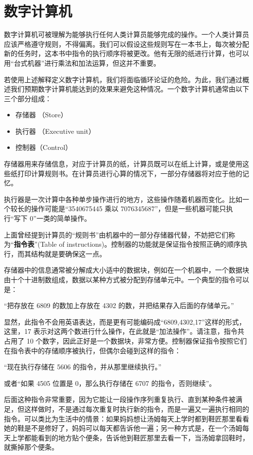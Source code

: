 \documentclass[12pt,a4paper,twoside]{article}
\begin{document}
\section{数字计算机}
数字计算机可被理解为能够执行任何人类计算员能够完成的操作。一个人类计算员应该严格遵守规则，不得偏离。我们可以假设这些规则写在一本书上，每次被分配新的任务时，这本书中指令的执行顺序将被更改。他有无限的纸进行计算，也可以用“台式机器”进行乘法和加法运算，但这并不重要。

若使用上述解释定义数字计算机，我们将面临循环论证的危险。为此，我们通过概述我们预期数字计算机能达到的效果来避免这种情况。一个数字计算机通常由以下三个部分组成：

\begin{itemize}
\item 存储器 （Store）
\item 执行器 （Executive unit）
\item 控制器（Control）
\end{itemize}

存储器用来存储信息，对应于计算员的纸，计算员既可以在纸上计算，或是使用这些纸打印计算规则书。在计算员进行心算的情况下，一部分存储器将对应于他的记忆。

执行器是一次计算中各种单步操作进行的地方，这些操作随着机器而变化。比如一个较长的操作可能是“3540675445 乘以 7076345687”，但是一些机器可能只执行“写下 0”一类的简单操作。

上面曾经提到计算员的“规则书”由机器中的一部分存储器代替，不妨把它们称为“\textbf{指令表}”(Table of instructions)。控制器的功能就是保证指令按照正确的顺序执行，而其结构就是要确保这一点。

存储器中的信息通常被分解成大小适中的数据块，例如在一个机器中，一个数据块由十个十进制数组成，数据以某种方式被分配到存储单元中。一个典型的指令可以是：

“把存放在 6809 的数加上存放在 4302 的数，并把结果存入后面的存储单元。”

显然，此指令不会用英语表达，而是更有可能编码成“6809,4302,17”这样的形式，这里，17 表示对这两个数进行什么操作，在此就是“加法操作”。请注意，指令共占用了 10 个数字，因此正好是一个数据块，非常方便。控制器保证指令按照它们在指令表中的存储顺序被执行，但偶尔会碰到这样的指令：

“现在执行存储在 5606 的指令，并从那里继续执行。”

或者“如果 4505 位置是 0，那么执行存储在 6707 的指令，否则继续”。

后面这种指令非常重要，因为它能让一段操作序列重复执行、直到某种条件被满足，但这样做时，不是通过每次重复时执行新的指令，而是一遍又一遍执行相同的指令。可以类比为生活中的情景：如果妈妈想让汤姆每天上学时都到鞋匠那里看看她的鞋是不是修好了，妈妈可以每天都告诉他一遍；另一种方式是，在一个汤姆每天上学都能看到的地方贴个便条，告诉他到鞋匠那里去看一下，当汤姆拿回鞋时，就撕掉那个便条。
\end{document}

